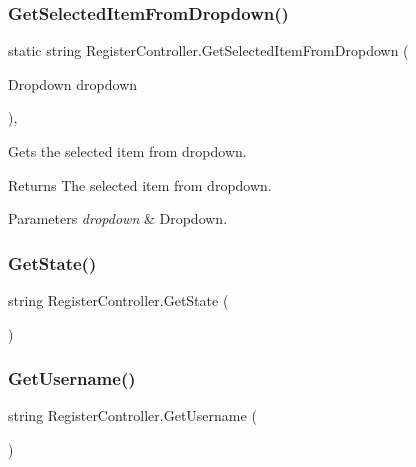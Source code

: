 \subsubsection{\texorpdfstring{Get\+Selected\+Item\+From\+Dropdown()}{GetSelectedItemFromDropdown()}}
{\footnotesize\ttfamily static string Register\+Controller.\+Get\+Selected\+Item\+From\+Dropdown (\begin{DoxyParamCaption}\item[{Dropdown}]{dropdown }\end{DoxyParamCaption})\hspace{0.3cm}{\ttfamily [inline]}, {\ttfamily [static]}}



Gets the selected item from dropdown. 

\begin{DoxyReturn}{Returns}
The selected item from dropdown.
\end{DoxyReturn}

\begin{DoxyParams}{Parameters}
{\em dropdown} & Dropdown.\\
\hline
\end{DoxyParams}
\mbox{\label{classRegisterController_a8f676337877ac8e82fd695c7cf7d38fb}} 
\subsubsection{\texorpdfstring{Get\+State()}{GetState()}}
{\footnotesize\ttfamily string Register\+Controller.\+Get\+State (\begin{DoxyParamCaption}{ }\end{DoxyParamCaption})\hspace{0.3cm}{\ttfamily [inline]}}

\mbox{\label{classRegisterController_a9c65087784b926a7bfa3883cd7df74df}} 
\subsubsection{\texorpdfstring{Get\+Username()}{GetUsername()}}
{\footnotesize\ttfamily string Register\+Controller.\+Get\+Username (\begin{DoxyParamCaption}{ }\end{DoxyParamCaption})\hspace{0.3cm}{\ttfamily [inline]}}

